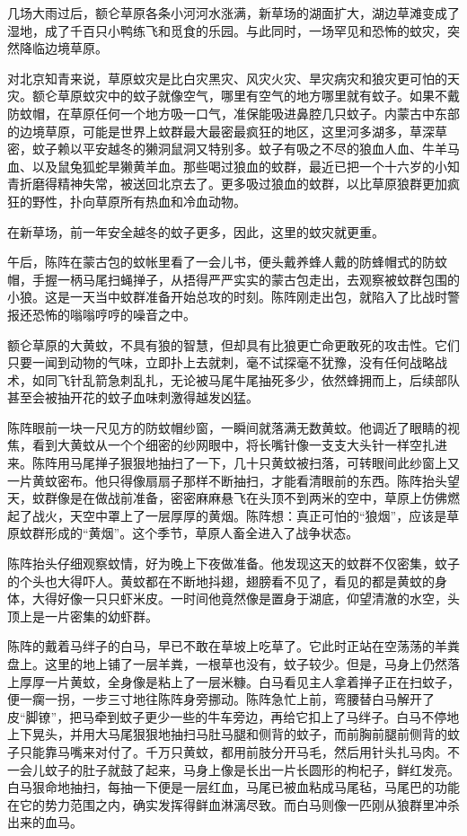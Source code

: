 \par 几场大雨过后，额仑草原各条小河河水涨满，新草场的湖面扩大，湖边草滩变成了湿地，成了千百只小鸭练飞和觅食的乐园。与此同时，一场罕见和恐怖的蚊灾，突然降临边境草原。
\par 对北京知青来说，草原蚊灾是比白灾黑灾、风灾火灾、旱灾病灾和狼灾更可怕的天灾。额仑草原蚊灾中的蚊子就像空气，哪里有空气的地方哪里就有蚊子。如果不戴防蚊帽，在草原任何一个地方吸一口气，准保能吸进鼻腔几只蚊子。内蒙古中东部的边境草原，可能是世界上蚊群最大最密最疯狂的地区，这里河多湖多，草深草密，蚊子赖以平安越冬的獭洞鼠洞又特别多。蚊子有吸之不尽的狼血人血、牛羊马血、以及鼠兔狐蛇旱獭黄羊血。那些喝过狼血的蚊群，最近已把一个十六岁的小知青折磨得精神失常，被送回北京去了。更多吸过狼血的蚊群，以比草原狼群更加疯狂的野性，扑向草原所有热血和冷血动物。
\par 在新草场，前一年安全越冬的蚊子更多，因此，这里的蚊灾就更重。
\par 午后，陈阵在蒙古包的蚊帐里看了一会儿书，便头戴养蜂人戴的防蜂帽式的防蚊帽，手握一柄马尾扫蝇掸子，从捂得严严实实的蒙古包走出，去观察被蚊群包围的小狼。这是一天当中蚊群准备开始总攻的时刻。陈阵刚走出包，就陷入了比战时警报还恐怖的嗡嗡哼哼的噪音之中。
\par 额仑草原的大黄蚊，不具有狼的智慧，但却具有比狼更亡命更敢死的攻击性。它们只要一闻到动物的气味，立即扑上去就刺，毫不试探毫不犹豫，没有任何战略战术，如同飞针乱箭急刺乱扎，无论被马尾牛尾抽死多少，依然蜂拥而上，后续部队甚至会被抽开花的蚊子血味刺激得越发凶猛。
\par 陈阵眼前一块一尺见方的防蚊帽纱窗，一瞬间就落满无数黄蚊。他调近了眼睛的视焦，看到大黄蚊从一个个细密的纱网眼中，将长嘴针像一支支大头针一样空扎进来。陈阵用马尾掸子狠狠地抽扫了一下，几十只黄蚊被扫落，可转眼间此纱窗上又一片黄蚊密布。他只得像扇扇子那样不断抽扫，才能看清眼前的东西。陈阵抬头望天，蚊群像是在做战前准备，密密麻麻悬飞在头顶不到两米的空中，草原上仿佛燃起了战火，天空中罩上了一层厚厚的黄烟。陈阵想：真正可怕的“狼烟”，应该是草原蚊群形成的“黄烟”。这个季节，草原人畜全进入了战争状态。
\par 陈阵抬头仔细观察蚊情，好为晚上下夜做准备。他发现这天的蚊群不仅密集，蚊子的个头也大得吓人。黄蚊都在不断地抖翅，翅膀看不见了，看见的都是黄蚊的身体，大得好像一只只虾米皮。一时间他竟然像是置身于湖底，仰望清澈的水空，头顶上是一片密集的幼虾群。
\par 陈阵的戴着马绊子的白马，早已不敢在草坡上吃草了。它此时正站在空荡荡的羊粪盘上。这里的地上铺了一层羊粪，一根草也没有，蚊子较少。但是，马身上仍然落上厚厚一片黄蚊，全身像是粘上了一层米糠。白马看见主人拿着掸子正在扫蚊子，便一瘸一拐，一步三寸地往陈阵身旁挪动。陈阵急忙上前，弯腰替白马解开了皮“脚镣”，把马牵到蚊子更少一些的牛车旁边，再给它扣上了马绊子。白马不停地上下晃头，并用大马尾狠狠地抽扫马肚马腿和侧背的蚊子，而前胸前腿前侧背的蚊子只能靠马嘴来对付了。千万只黄蚊，都用前肢分开马毛，然后用针头扎马肉。不一会儿蚊子的肚子就鼓了起来，马身上像是长出一片长圆形的枸杞子，鲜红发亮。白马狠命地抽扫，每抽一下便是一层红血，马尾已被血粘成马尾毡，马尾巴的功能在它的势力范围之内，确实发挥得鲜血淋漓尽致。而白马则像一匹刚从狼群里冲杀出来的血马。
